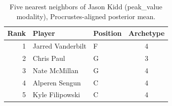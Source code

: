 \begin{table}[htbp]
  \centering\small
  \begin{tabular}{rllc}
    \toprule
    Rank & Player & Position & Archetype \\
    \midrule
    1 & Jarred Vanderbilt & F & 4 \\
    2 & Chris Paul & G & 3 \\
    3 & Nate McMillan & G & 4 \\
    4 & Alperen Sengun & C & 4 \\
    5 & Kyle Filipowski & C & 4 \\
    \bottomrule
  \end{tabular}
  \caption{Five nearest neighbors of Jason Kidd (peak_value modality), Procrustes-aligned posterior mean.}
  \label{tab:Jason_Kidd_neighbors_peak_value}
\end{table}

